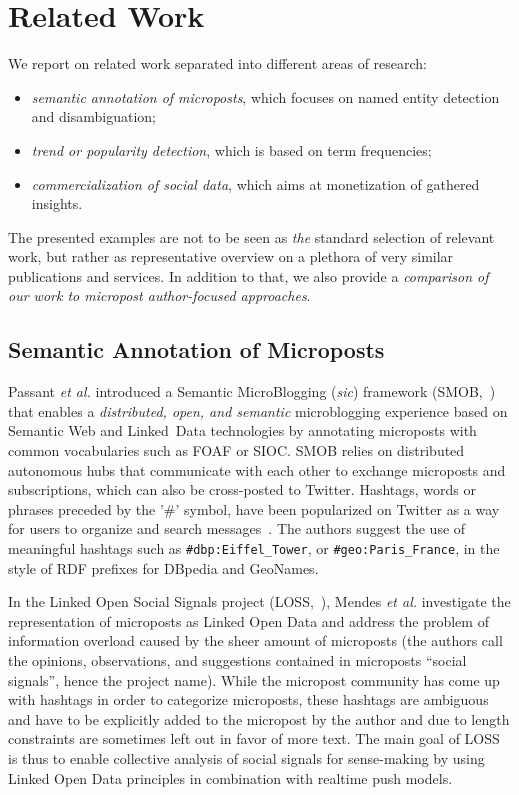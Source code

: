 \documentclass{iosart2c}
\begin{document}
\section{Related Work} \label{sec:relatedwork}
We report on related work separated into different areas of research:
\begin{itemize}
\item \emph{semantic annotation of microposts}, which focuses on named entity detection and disambiguation;
\item \emph{trend or popularity detection}, which is based on term frequencies;
\item \emph{commercialization of social data}, which aims at monetization of gathered insights.
\end{itemize}
The presented examples are not to be seen as \emph{the} standard selection of relevant work, but rather as representative overview on a plethora of very similar publications and services.
In addition to that, we also provide a \emph{comparison of our work to micropost author-focused approaches}.

\subsection{Semantic Annotation of Microposts}
Passant \textit{et al.} introduced a Semantic MicroBlogging (\textit{sic}) framework (SMOB,~\cite{Passant2008}) that enables a \textit{distributed, open, and semantic} microblogging experience based on Semantic Web and Linked~Data technologies by annotating microposts with common vocabularies such as FOAF or SIOC.
SMOB relies on distributed autonomous hubs that communicate with each other to exchange microposts and subscriptions, which can also be cross-posted to Twitter.
Hashtags, words or phrases preceded by the '\#' symbol, have been popularized on Twitter as a way for users to organize and search messages~\cite{hashtag}.
The authors suggest the use of meaningful hashtags such as \texttt{\#dbp:Eiffel\_Tower}, or \texttt{\#geo:Paris\_France}, in the style of RDF prefixes for DBpedia and GeoNames.

In the Linked Open Social Signals project (LOSS,~\cite{Mendes:LOSS}), Mendes \textit{et al.} investigate the representation of microposts as Linked Open Data and address the problem of information overload caused by the sheer amount of microposts (the authors call the opinions, observations, and suggestions contained in microposts ``social signals'', hence the project name).
While the micropost community has come up with hashtags in order to categorize microposts, these hashtags are ambiguous and have to be explicitly added to the micropost by the author and due to length constraints are sometimes left out in favor of more text.
The main goal of LOSS is thus to enable collective analysis of social signals for sense-making by using Linked Open Data principles in combination with realtime push models.
\end{document}
